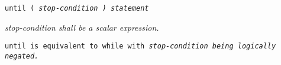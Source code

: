 
\tt{until (} \it{stop-condition} \tt{)} \it{statement}


\it{stop-condition} shall be a scalar expression.


\tt{until} is equivalent to \tt{while} with
\it{stop-condition} being logically negated.
